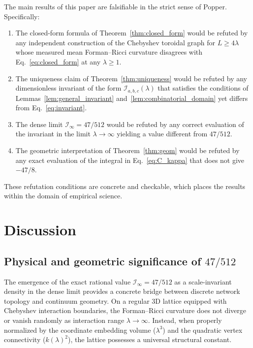 \documentclass[aps,pre,onecolumn,10pt,groupedaddress,amsmath,amssymb,floatfix]{revtex4-2}
\begin{document}
The main results of this paper are falsifiable in the strict sense of Popper. Specifically:
\begin{enumerate}
\item The closed-form formula of Theorem~\ref{thm:closed_form} would be refuted by any independent construction of the Chebyshev toroidal graph for $L \ge 4\lambda$ whose measured mean Forman--Ricci curvature disagrees with Eq.~\eqref{eq:closed_form} at any $\lambda \ge 1$.
\item The uniqueness claim of Theorem~\ref{thm:uniqueness} would be refuted by any dimensionless invariant of the form $\mathcal{I}_{a,b,c}(\lambda)$ that satisfies the conditions of Lemmas~\ref{lem:general_invariant} and~\ref{lem:combinatorial_domain} yet differs from Eq.~\eqref{eq:invariant}.
\item The dense limit $\mathcal{I}_\infty = 47/512$ would be refuted by any correct evaluation of the invariant in the limit $\lambda \to \infty$ yielding a value different from $47/512$.
\item The geometric interpretation of Theorem~\ref{thm:geom} would be refuted by any exact evaluation of the integral in Eq.~\eqref{eq:C_kappa} that does not give $-47/8$.
\end{enumerate}
These refutation conditions are concrete and checkable, which places the results within the domain of empirical science.

\section{Discussion}
\label{sec:discussion}

\subsection{Physical and geometric significance of $47/512$}

The emergence of the exact rational value $\mathcal{I}_\infty = 47/512$ as a scale-invariant density in the dense limit provides a concrete bridge between discrete network topology and continuum geometry. On a regular 3D lattice equipped with Chebyshev interaction boundaries, the Forman--Ricci curvature does not diverge or vanish randomly as interaction range $\lambda \to \infty$. Instead, when properly normalized by the coordinate embedding volume ($\lambda^3$) and the quadratic vertex connectivity ($k(\lambda)^2$), the lattice possesses a universal structural constant.
\end{document}
